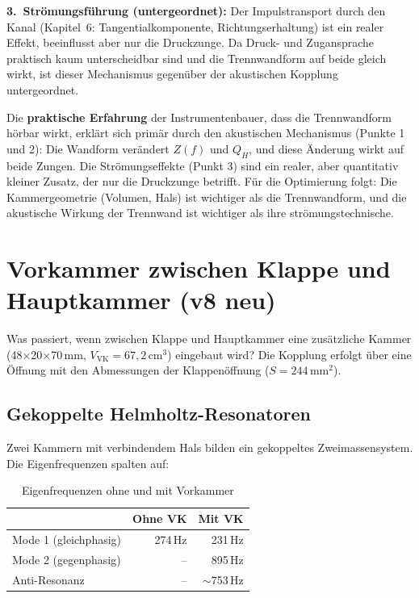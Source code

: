 \documentclass[11pt,a4paper]{article}
\begin{document}
\textbf{3.\ Strömungsführung (untergeordnet):} Der Impulstransport durch den Kanal (Kapitel~6: Tangentialkomponente, Richtungserhaltung) ist ein realer Effekt, beeinflusst aber nur die Druckzunge. Da Druck- und Zugansprache praktisch kaum unterscheidbar sind und die Trennwandform auf beide gleich wirkt, ist dieser Mechanismus gegenüber der akustischen Kopplung untergeordnet.

\begin{keybox}
Die \textbf{praktische Erfahrung} der Instrumentenbauer, dass die Trennwandform hörbar wirkt, erklärt sich primär durch den akustischen Mechanismus (Punkte 1 und 2): Die Wandform verändert $Z(f)$ und $Q_H$, und diese Änderung wirkt auf beide Zungen. Die Strömungseffekte (Punkt 3) sind ein realer, aber quantitativ kleiner Zusatz, der nur die Druckzunge betrifft. Für die Optimierung folgt: Die Kammergeometrie (Volumen, Hals) ist wichtiger als die Trennwandform, und die akustische Wirkung der Trennwand ist wichtiger als ihre strömungstechnische.
\end{keybox}

\section{Vorkammer zwischen Klappe und Hauptkammer (v8 neu)}

Was passiert, wenn zwischen Klappe und Hauptkammer eine zusätzliche Kammer (48$\times$20$\times$70\,mm, $V_\text{VK} = 67{,}2$\,cm$^3$) eingebaut wird? Die Kopplung erfolgt über eine Öffnung mit den Abmessungen der Klappenöffnung ($S = 244$\,mm$^2$).

\subsection{Gekoppelte Helmholtz-Resonatoren}

Zwei Kammern mit verbindendem Hals bilden ein gekoppeltes Zweimassensystem. Die Eigenfrequenzen spalten auf:

\begin{table}[H]
\centering\small
\begin{tabular}{lrr}
\toprule
& Ohne VK & Mit VK \\
\midrule
Mode 1 (gleichphasig) & 274\,Hz & 231\,Hz \\
Mode 2 (gegenphasig)  & -- & 895\,Hz \\
Anti-Resonanz          & -- & $\sim$753\,Hz \\
\bottomrule
\end{tabular}
\caption{Eigenfrequenzen ohne und mit Vorkammer}
\end{table}
\end{document}
